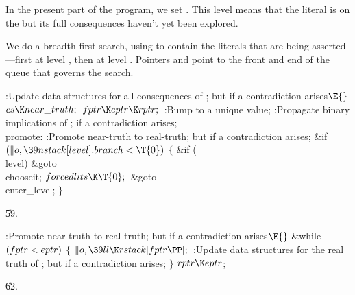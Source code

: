 In the present part of the program, we set . This
level means that the literal is on the  but its full
consequences
haven't yet been explored.

We do a breadth-first search, using  to contain the
literals that are being asserted---first at level ,
then at level . Pointers  and 
point to the front
and end of the queue that governs the search.

\Y\B\4:Update data structures for all consequences of ; but  if a contradiction arises\X${}\E{}$\6
$\\{cs}\K\\{near\_truth};{}$\6
${}\\{fptr}\K\\{eptr}\K\\{rptr};{}$\6
:Bump  to a unique value\X;\6
:Propagate binary implications of ;  if a
contradiction arises\X;\6
\4\\{promote}:\5
:Promote near-truth to real-truth; but  if a
contradiction arises\X;\6
\&{if} ${}(\|o,\39\\{nstack}[\\{level}].\\{branch}<\T{0}){}$\5
${}\{{}$\1\6
\&{if} (\\{level})\1\5
\&{goto} \\{chooseit};\2\6
${}\\{forcedlits}\K\T{0};{}$\6
\&{goto} \\{enter\_level};\6
\4${}\}{}$\2\par
\U59.\fi

\B{}:Promote near-truth to real-truth; but 
if a contradiction arises\X${}\E{}$\6
\&{while} ${}(\\{fptr}<\\{eptr}){}$\5
${}\{{}$\1\6
${}\|o,\39\\{ll}\K\\{rstack}[\\{fptr}\PP];{}$\6
:Update data structures for the real truth of ; but  if a contradiction arises\X;\6
\4${}\}{}$\2\6
${}\\{rptr}\K\\{eptr}{}$;\par
\U62.\fi

